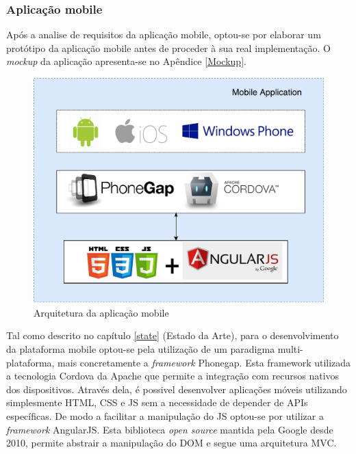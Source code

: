 












\subsubsection{Aplicação mobile}


Após a analise de requisitos da aplicação mobile, optou-se por elaborar um protótipo da aplicação mobile antes de proceder à sua real implementação. O \textit{mockup} da aplicação apresenta-se no Apêndice \ref{Mockup}. 

\begin{figure}[h]
	\centering
	\includegraphics[scale = 0.5]{esquemas/arquitetura-mobile.pdf}
	\caption{Arquitetura da aplicação mobile}
	\label{arquiteturamobile}
\end{figure}


Tal como descrito no capítulo \ref{state} (Estado da Arte), para o desenvolvimento da plataforma mobile optou-se pela utilização de um paradigma multi-plataforma, mais concretamente a \textit{framework} Phonegap. Esta framework utilizada a tecnologia Cordova da Apache que permite a integração com recursos nativos dos dispositivos. Através dela, é possivel desenvolver aplicações móveis utilizando simplesmente \ac{HTML}, \ac{CSS} e \ac{JS} sem a necessidade de depender de APIs específicas. De modo a facilitar a manipulação do \ac{JS} optou-se por utilizar a \textit{framework} AngularJS. Esta biblioteca \textit{open source} mantida pela Google desde 2010, permite abstrair a manipulação do \ac{DOM} e segue uma arquitetura \ac{MVC}\cite{Google2015}. 



